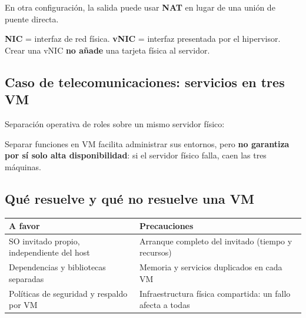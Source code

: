 \documentclass[11pt,a4paper]{article}
\begin{document}
En otra configuración, la salida puede usar \textbf{NAT} en lugar de una unión de puente directa.

\begin{defbox}
\textbf{NIC} = interfaz de red física. \textbf{vNIC} = interfaz presentada por el hipervisor.
Crear una vNIC \textbf{no añade} una tarjeta física al servidor.
\end{defbox}

\subsection{Caso de telecomunicaciones: servicios en tres VM}

Separación operativa de roles sobre un mismo servidor físico:

\begin{center}
\end{center}

\begin{errorbox}
Separar funciones en VM facilita administrar sus entornos, pero \textbf{no garantiza por sí
solo alta disponibilidad}: si el servidor físico falla, caen las tres máquinas.
\end{errorbox}

\subsection{Qué resuelve y qué no resuelve una VM}

\begin{center}
\begin{tabularx}{\textwidth}{@{}>{\raggedright\arraybackslash}X >{\raggedright\arraybackslash}X@{}}
\toprule
\textbf{\color{tealx}A favor} & \textbf{\color{vinox}Precauciones} \\
\midrule
SO invitado propio, independiente del host & Arranque completo del invitado (tiempo y recursos) \\
Dependencias y bibliotecas separadas & Memoria y servicios duplicados en cada VM \\
Políticas de seguridad y respaldo por VM & Infraestructura física compartida: un fallo afecta a todas \\
\bottomrule
\end{tabularx}
\end{center}
\end{document}
